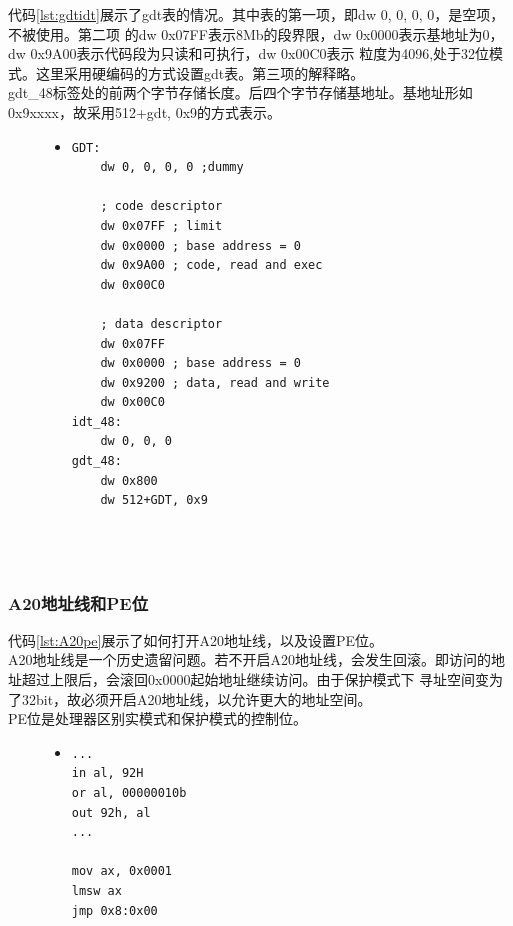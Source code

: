 \documentclass[a4paper]{article}
\begin{document}
        代码\ref{lst:gdtidt}展示了gdt表的情况。其中表的第一项，即dw 0, 0, 0, 0，是空项，不被使用。第二项
        的dw 0x07FF表示8Mb的段界限，dw 0x0000表示基地址为0，dw 0x9A00表示代码段为只读和可执行，dw 0x00C0表示
        粒度为4096,处于32位模式。这里采用硬编码的方式设置gdt表。第三项的解释略。\\ 

        gdt\_48标签处的前两个字节存储长度。后四个字节存储基地址。基地址形如0x9xxxx，故采用512+gdt, 0x9的方式表示。

        \begin{figure}[!hbt]
        \begin{itemize}
        \item[] \begin{lstlisting}[language={[x86masm]Assembler}, label=lst:gdtidt, caption=GDT和IDT]
GDT:
    dw 0, 0, 0, 0 ;dummy

    ; code descriptor
    dw 0x07FF ; limit
    dw 0x0000 ; base address = 0
    dw 0x9A00 ; code, read and exec
    dw 0x00C0 

    ; data descriptor
    dw 0x07FF 
    dw 0x0000 ; base address = 0
    dw 0x9200 ; data, read and write
    dw 0x00C0
idt_48:
    dw 0, 0, 0
gdt_48:
    dw 0x800
    dw 512+GDT, 0x9


        
        \end{lstlisting}
        \end{itemize}
        \end{figure}

        \subsubsection{A20地址线和PE位}        
        代码\ref{lst:A20pe}展示了如何打开A20地址线，以及设置PE位。\\ 

        A20地址线是一个历史遗留问题。若不开启A20地址线，会发生回滚。即访问的地址超过上限后，会滚回0x0000起始地址继续访问。由于保护模式下
        寻址空间变为了32bit，故必须开启A20地址线，以允许更大的地址空间。\\ 

        PE位是处理器区别实模式和保护模式的控制位。
        \begin{figure}[!hbt]
        \begin{itemize}
        \item[] \begin{lstlisting}[language={[x86masm]Assembler}, label=lst:A20pe, caption=打开A20地址线，设置PE位]
...
in al, 92H
or al, 00000010b
out 92h, al   
...

mov ax, 0x0001
lmsw ax
jmp 0x8:0x00
        \end{lstlisting}
        \end{itemize}
        \end{figure}
\end{document}
